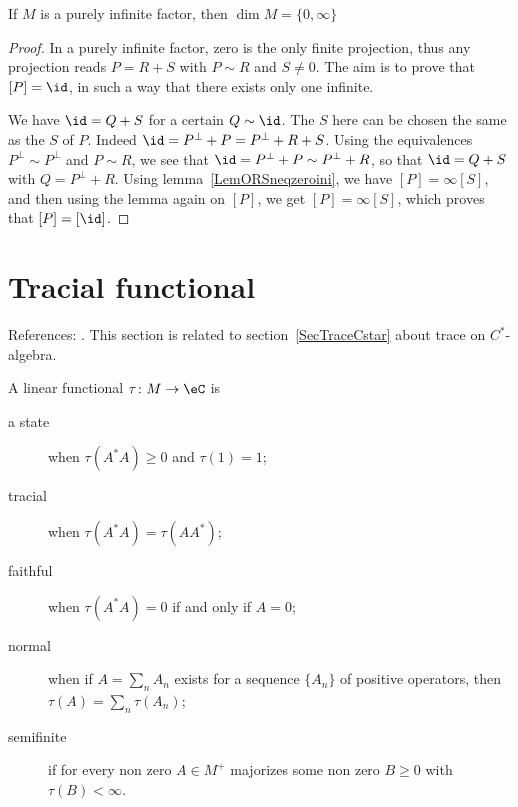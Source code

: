 \begin{corollary}
	If $M$ is a purely infinite factor, then $\dim M=\{ 0,\infty \}$
\end{corollary}

\begin{proof}
	In a purely infinite factor, zero is the only finite projection, thus any projection reads $P=R+S$ with $P\sim R$ and $S\neq 0$. The aim is to prove that $[P]=\id$, in such a way that there exists only one infinite.

	We have $\id=Q+S$ for a certain $Q\sim \id$. The $S$ here can be chosen the same as the $S$ of $P$. Indeed $\id=P^{\perp}+P=P^{\perp}+R+S$. Using the equivalences $P^{\perp}\sim P^{\perp}$ and $P\sim R$, we see that $\id=P^{\perp}+P\sim P^{\perp}+R$, so that $\id=Q+S$ with $Q=P^{\perp}+R$. Using lemma~\ref{LemORSneqzeroini}, we have $[P]=\infty[S]$, and then using the lemma again on $[P]$, we get $[P]=\infty[S]$, which proves that $[P]=[\id]$.
\end{proof}

\section{Tracial functional}
\label{SecTracevonNeuman}

References: \cite{DixmierTrace,TrioloSemifinite}. This section is related to section~\ref{SecTraceCstar} about trace on $C^*$-algebra.

A linear functional $\tau\colon M\to \eC$ is
\begin{description}
	\item[a state] when $\tau(A^*A)\geq0$ and $\tau(1)=1$;
		\item[tracial] when $\tau(A^*A)=\tau(AA^*)$;
		\item[faithful] when $\tau(A^*A)=0$ if and only if $A=0$;
		\item[normal] when if $A=\sum_n A_n$ exists for a sequence $\{ A_n \}$ of positive operators, then $\tau(A)=\sum_n\tau(A_n)$;
		\item[semifinite] if for every non zero $A\in M^+$ majorizes some non zero $B\geq 0$ with $\tau(B)<\infty$.
\end{description}

